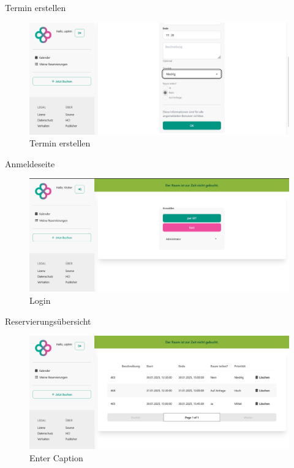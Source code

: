 \documentclass{sdqbeamer}
\begin{document}
\begin{frame}{Termin erstellen}
    \begin{figure}
        \centering
        \includegraphics[width=1\linewidth]{bookings_create_form_2.png}
        \caption{Termin erstellen}
        \label{fig:enter-label}
    \end{figure}
\end{frame}

\begin{frame}{Anmeldeseite}
    \begin{figure}
        \centering
        \includegraphics[width=1\linewidth]{auth_login.png}
        \caption{Login}
        \label{fig:enter-label}
    \end{figure}
\end{frame}

\begin{frame}{Reservierungsübersicht}
    \begin{figure}
        \centering
        \includegraphics[width=1\linewidth]{bookings_list.png}
        \caption{Enter Caption}
        \label{fig:enter-label}
    \end{figure}
\end{frame}
\end{document}
